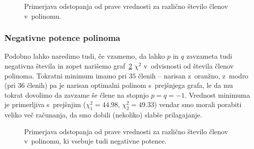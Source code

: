 \documentclass[a4paper,pdftex,12pt]{article}
\numberwithin{figure}{section} %
\begin{document}
\begin{figure}    
    \resizebox{0.98\linewidth}{!}{}
    \caption{Primerjava odstopanja od prave vrednosti za različno število členov 
    v~polinomu.}
    \label{slika7}
\end{figure}
\subsubsection*{Negativne potence polinoma}
Podobno lahko naredimo tudi, če vzamemo, da lahko $p$ in $q$ zavzameta tudi negativna 
števila in zopet narišemo graf~\ref{slika8} $\chi^2$ v~odvisnosti od števila členov 
polinoma. Tokratni minimum imamo pri $35$ členih -- narisan z~oranžno, z~modro (pri
$36$ členih) pa je narisan optimalni polinom s~prejšnjega grafa, le da mu tokrat
dovolimo da zavzame še člene na stopnjo $p=q=-1$. Vrednost minimuma je primerljiva 
s~prejšnjim ($\chi^2_1 = 44.98$, $\chi^2_2 = 49.33$) vendar smo morali porabiti
veliko več računanja, da smo dobili (nekoliko) slabše prilagajanje.
\begin{figure}    
    \resizebox{0.98\linewidth}{!}{}
    \caption{Primerjava odstopanja od prave vrednosti za različno število členov 
    v~polinomu, ki vsebuje tudi negativne potence.}
    \label{slika8}
\end{figure}
\end{document}
